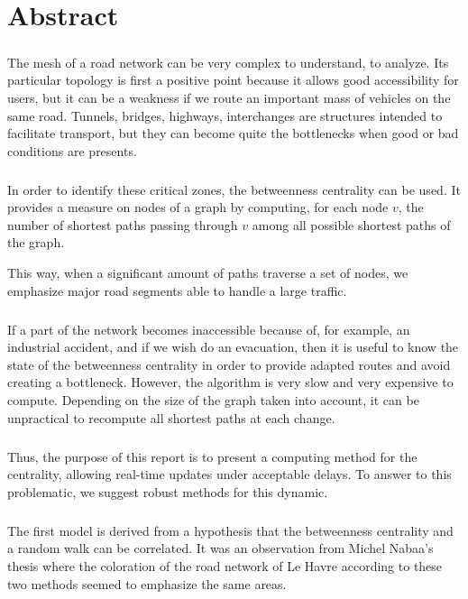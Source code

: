 \documentclass[a4paper, 10pt]{report}
\newcommand{\chaptertoc}[1]{\chapter*{#1}
\addcontentsline{toc}{chapter}{#1}
\markboth{\slshape\MakeUppercase{#1}}{\slshape\MakeUppercase{#1}}}
\begin{document}
\tableofcontents

\newpage

\chaptertoc{Abstract}

\paragraph{}The mesh of a road network can be very complex to understand, to analyze. Its particular topology is first a positive point because it allows  good accessibility for users, but it can be a weakness if we route an important mass of vehicles on the same road. Tunnels, bridges, highways, interchanges are structures intended to facilitate transport, but they can become quite the bottlenecks when good or bad conditions are presents.

\paragraph{}In order to identify these critical zones, the betweenness centrality can be used. It provides a measure on nodes of a graph by computing, for each node $v$, the number of shortest paths passing through $v$ among all possible shortest paths of the graph.

This way, when a significant amount of paths traverse a set of nodes, we emphasize major road segments able to handle a large traffic. 

\paragraph{}If a part of the network becomes inaccessible because of, for example, an industrial accident, and if we wish do an evacuation, then it is useful to know the state of the betweenness centrality in order to provide adapted routes and avoid creating a bottleneck.
However, the algorithm is very slow and very expensive to compute. Depending on the size of the graph taken into account, it can be unpractical to recompute all shortest paths at each change.

\paragraph{}Thus, the purpose of this report is to present a computing method for the centrality, allowing real-time updates under acceptable delays.
To answer to this problematic, we suggest robust methods for this dynamic.

\paragraph{}The first model is derived from a hypothesis that the betweenness centrality and a random walk can be correlated. It was an observation from Michel Nabaa's thesis where the coloration of the road network of Le Havre according to these two methods seemed to emphasize the same areas.
\end{document}
